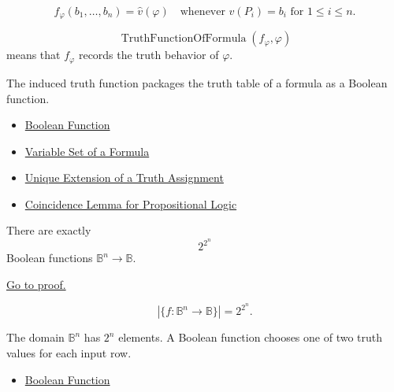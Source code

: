 \begin{remark*}
\[
f_\varphi(b_1,\ldots,b_n)=\widehat v(\varphi)
\quad
\text{whenever }
v(P_i)=b_i\text{ for }1\le i\le n.
\]
\end{remark*}

\begin{remark*}
\[
\operatorname{TruthFunctionOfFormula}(f_\varphi,\varphi)
\]
means that \(f_\varphi\) records the truth behavior of \(\varphi\).
\end{remark*}

\begin{remark*}[Interpretation]
The induced truth function packages the truth table of a formula as a Boolean function.
\end{remark*}

\begin{dependencies}
\begin{itemize}
  \item \hyperref[def:boolean-function-propositional-logic]{Boolean Function}
  \item \hyperref[def:formula-variable-set-propositional-logic]{Variable Set of a Formula}
  \item \hyperref[thm:unique-extension-truth-assignment-propositional-logic]{Unique Extension of a Truth Assignment}
  \item \hyperref[lem:coincidence-lemma-propositional-logic]{Coincidence Lemma for Propositional Logic}
\end{itemize}
\end{dependencies}
\begin{tcolorbox}[colback=thmbox, colframe=thmborder, arc=2pt,
  left=6pt, right=6pt, top=4pt, bottom=4pt,
  title={\small\textbf{Theorem (Counting Boolean Functions)}},
  fonttitle=\small\bfseries]
\begin{theorem}
\label{thm:counting-boolean-functions}
There are exactly
\[
2^{2^n}
\]
Boolean functions \(\mathbb{B}^n\to\mathbb{B}\).

\noindent\hyperref[prf:counting-boolean-functions]{Go to proof.}
\end{theorem}
\end{tcolorbox}

\begin{remark*}
\[
\left|\{f:\mathbb{B}^n\to\mathbb{B}\}\right|=2^{2^n}.
\]
\end{remark*}

\begin{remark*}[Interpretation]
The domain \(\mathbb{B}^n\) has \(2^n\) elements. A Boolean function chooses one of two truth values for each input row.
\end{remark*}

\begin{dependencies}
\begin{itemize}
  \item \hyperref[def:boolean-function-propositional-logic]{Boolean Function}
\end{itemize}
\end{dependencies}
